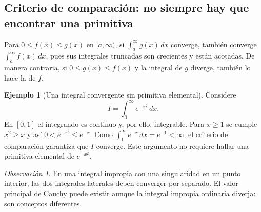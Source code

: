 \documentclass[12pt]{article}
\theoremstyle{definition}
\newtheorem{ejemplo}[teorema]{Ejemplo}
\theoremstyle{remark}
\newtheorem*{observacion}{Observación}
\begin{document}

\subsection*{Criterio de comparación: no siempre hay que encontrar una primitiva}
Para $0\le f(x)\le g(x)$ en $[a,\infty)$, si $\int_a^\infty g(x)\,dx$ converge, también converge $\int_a^\infty f(x)\,dx$, pues sus integrales truncadas son crecientes y están acotadas. De manera contraria, si $0\le g(x)\le f(x)$ y la integral de $g$ diverge, también lo hace la de $f$.
\begin{ejemplo}[Una integral convergente sin primitiva elemental]
Considere
\[
I=\int_0^\infty e^{-x^2}\,dx.
\]
En $[0,1]$ el integrando es continuo y, por ello, integrable. Para $x\ge1$ se cumple $x^2\ge x$ y así $0<e^{-x^2}\le e^{-x}$. Como $\int_1^\infty e^{-x}\,dx=e^{-1}<\infty$, el criterio de comparación garantiza que $I$ converge. Este argumento no requiere hallar una primitiva elemental de $e^{-x^2}$.
\end{ejemplo}
\begin{observacion}
En una integral impropia con una singularidad en un punto interior, las dos integrales laterales deben converger por separado. El valor principal de Cauchy puede existir aunque la integral impropia ordinaria diverja: son conceptos diferentes.
\end{observacion}

\end{document}
